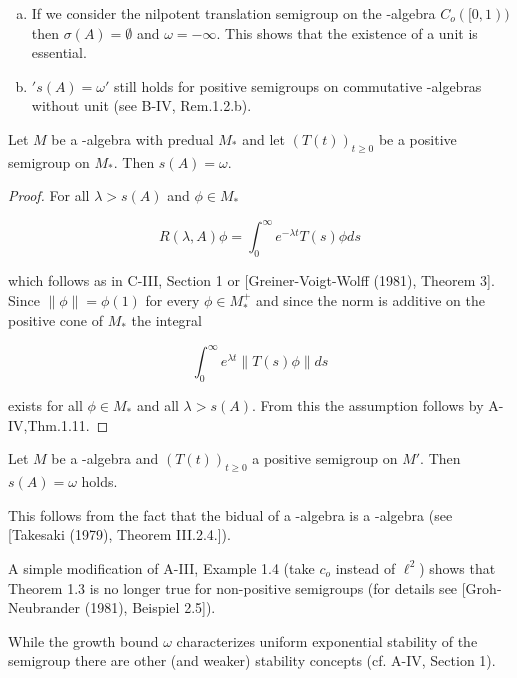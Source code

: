 \newpage

\begin{remark}\label{rem:d4-1.2}
\begin{enumerate}[(a)]
\item
If we consider the nilpotent translation semigroup on the \CA-algebra $C_{o}([0,1))$ then $\sigma(A) = \emptyset$ and $\omega = -\infty$.
This shows that the existence of a unit is essential.

\item
$'s(A) = \omega'$ still holds for positive semigroups on commutative \CA-algebras without unit (see B-IV, Rem.1.2.b).
\end{enumerate}
\end{remark}

\begin{theorem}\label{thm:d4-1.3}
Let $M$ be a \WA-algebra with predual $M_{*}$ and let $(T(t))_{t \geq 0}$ be a positive semigroup on $M_{*}$.
Then $s(A) = \omega$.
\end{theorem}

\begin{proof}
For all $\lambda > s(A)$ and $\phi \in M_{*}$

\[
R(\lambda,A)\phi = \int_{0}^{\infty} e^{-\lambda t}T(s)\phi ds
\]

which follows as in C-III, Section 1 or [Greiner-Voigt-Wolff (1981), Theorem 3].
Since $\|\phi\| = \phi(1)$ for every $\phi \in M_{*}^{+}$ and since the norm is additive on the positive cone of $M_{*}$ the integral

\[
\int_{0}^{\infty} e^{\lambda t}\|T(s)\phi\|ds
\]

exists for all $\phi \in M_{*}$ and all $\lambda > s(A)$.
From this the assumption follows by A-IV,Thm.1.11.
\end{proof}

\begin{corollary}\label{cor:d4-1.4}
Let $M$ be a \CA-algebra and $(T(t))_{t \geq 0}$ a positive semigroup on $M'$.
Then $s(A) = \omega$ holds.
\end{corollary}

This follows from the fact that the bidual of a \CA-algebra is a \WA-algebra (see [Takesaki (1979), Theorem III.2.4.]).

\begin{remark}\label{rem:d4-1.5}
A simple modification of A-III, Example 1.4 (take $c_{o}$ instead of $\ell^2$) shows that Theorem 1.3 is no longer true for non-positive semigroups (for details see [Groh-Neubrander (1981), Beispiel 2.5]).

While the growth bound $\omega$ characterizes uniform exponential stability of the semigroup there are other (and weaker) stability concepts (cf. A-IV, Section 1).
\end{remark}


